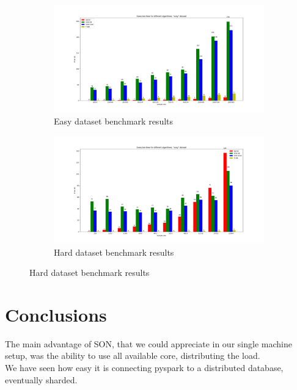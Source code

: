 \documentclass[a4paper]{article}
\begin{document}
	\begin{figure}[h]
		\centering
		\begin{subfigure}[b]{1\textwidth}
			\centering
			\includegraphics[width=\textwidth]{benchmarkeasy.png}
         	\caption{Easy dataset benchmark results}
         	\label{fig:easybenchmark}
		\end{subfigure}
		\hfill
		
		\begin{subfigure}[b]{1\textwidth}
			\centering
			\includegraphics[width=\textwidth]{benchmarkhard.png}
         	\caption{Hard dataset benchmark results}
         	\label{fig:hardbenchmark}
		\end{subfigure}
		\hfill
		
	\end{figure}

	
	\section{Conclusions}
	The main advantage of SON, that we could appreciate in our single machine setup, was the ability to use all available core, distributing the load.\\
	We have seen how easy it is connecting pyspark to a distributed database, eventually sharded.\\
\end{document}

